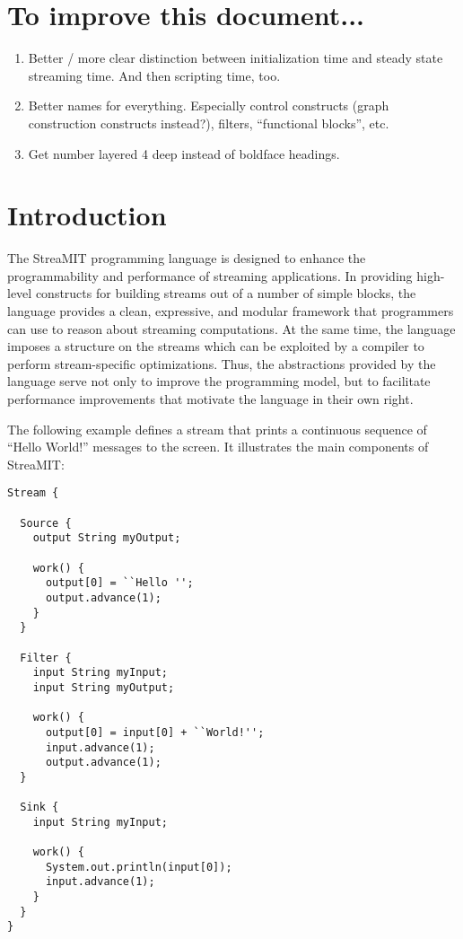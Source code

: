 \documentclass[draft]{article}
\begin{document}
\section{To improve this document...}

\begin{enumerate}

\item Better / more clear distinction between initialization time and
steady state streaming time.  And then scripting time, too.

\item Better names for everything.  Especially control constructs
(graph construction constructs instead?), filters, ``functional
blocks'', etc.

\item Get number layered 4 deep instead of boldface headings.

\end{enumerate}

\section{Introduction}
\label{sec:intro}

The StreaMIT programming language is designed to enhance the
programmability and performance of streaming applications.  In
providing high-level constructs for building streams out of a number
of simple blocks, the language provides a clean, expressive, and
modular framework that programmers can use to reason about streaming
computations.  At the same time, the language imposes a structure on
the streams which can be exploited by a compiler to perform
stream-specific optimizations.  Thus, the abstractions provided by the
language serve not only to improve the programming model, but to
facilitate performance improvements that motivate the language in
their own right.

The following example defines a stream that prints a continuous
sequence of ``Hello World!'' messages to the screen.  It illustrates
the main components of StreaMIT:

\begin{verbatim}
Stream {

  Source {
    output String myOutput;

    work() {
      output[0] = ``Hello '';
      output.advance(1);
    }
  }

  Filter {
    input String myInput;
    input String myOutput;

    work() {
      output[0] = input[0] + ``World!'';
      input.advance(1);
      output.advance(1);
  }

  Sink {
    input String myInput;
    
    work() {
      System.out.println(input[0]);
      input.advance(1);
    }
  }
}
\end{verbatim}
\end{document}
